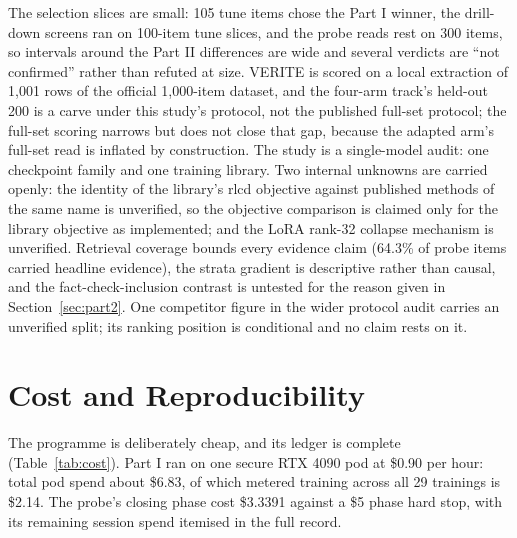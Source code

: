 \documentclass[conference]{IEEEtran}
\begin{document}
The selection slices are small: 105 tune items chose the Part I winner, the drill-down screens ran on 100-item tune slices, and the probe reads rest on 300 items, so intervals around the Part II differences are wide and several verdicts are ``not confirmed'' rather than refuted at size. VERITE is scored on a local extraction of 1,001 rows of the official 1,000-item dataset, and the four-arm track's held-out 200 is a carve under this study's protocol, not the published full-set protocol; the full-set scoring narrows but does not close that gap, because the adapted arm's full-set read is inflated by construction. The study is a single-model audit: one checkpoint family and one training library. Two internal unknowns are carried openly: the identity of the library's rlcd objective against published methods of the same name is unverified, so the objective comparison is claimed only for the library objective as implemented; and the LoRA rank-32 collapse mechanism is unverified. Retrieval coverage bounds every evidence claim (64.3\% of probe items carried headline evidence), the strata gradient is descriptive rather than causal, and the fact-check-inclusion contrast is untested for the reason given in Section~\ref{sec:part2}. One competitor figure in the wider protocol audit carries an unverified split; its ranking position is conditional and no claim rests on it.

\section{Cost and Reproducibility}

The programme is deliberately cheap, and its ledger is complete (Table~\ref{tab:cost}). Part I ran on one secure RTX 4090 pod at \$0.90 per hour: total pod spend about \$6.83, of which metered training across all 29 trainings is \$2.14. The probe's closing phase cost \$3.3391 against a \$5 phase hard stop, with its remaining session spend itemised in the full record.
\end{document}
